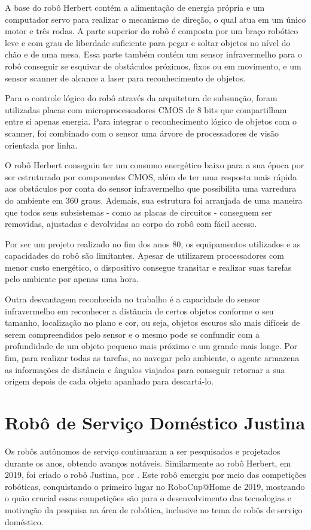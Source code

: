 A base do robô Herbert contém a alimentação de energia própria e um computador servo para realizar o mecanismo de direção, o qual atua em um único motor e três rodas. A parte superior do robô é composta por um braço robótico leve e com grau de liberdade suficiente para pegar e soltar objetos no nível do chão e de uma mesa. Essa parte também contém um sensor infravermelho para o robô conseguir se esquivar de obstáculos próximos, fixos ou em movimento, e um sensor scanner de alcance a laser para reconhecimento de objetos. 

Para o controle lógico do robô através da arquitetura de subsunção, foram utilizadas placas com microprocessadores CMOS de 8 bits  que compartilham entre si apenas energia. Para integrar o reconhecimento lógico de objetos com o scanner, foi combinado com o sensor uma árvore de processadores de visão orientada por linha. 

O robô Herbert conseguiu ter um consumo energético baixo para a sua época por ser estruturado por componentes CMOS, além de ter uma resposta mais rápida aos obstáculos por conta do sensor infravermelho que possibilita uma varredura do ambiente em 360 graus. Ademais, sua estrutura foi arranjada de uma maneira que todos seus subsistemas - como as placas de circuitos -  conseguem ser removidas, ajustadas e devolvidas ao corpo do robô com fácil acesso. 

Por ser um projeto realizado no fim dos anos 80, os equipamentos utilizados e as capacidades do robô são limitantes. Apesar de utilizarem processadores com menor custo energético, o dispositivo consegue transitar e realizar suas tarefas pelo ambiente por apenas uma hora. 

Outra desvantagem reconhecida no trabalho é a capacidade do sensor infravermelho em reconhecer a distância de certos objetos conforme o seu tamanho, localização no plano e cor, ou seja, objetos escuros são mais difíceis de serem compreendidos pelo sensor e o mesmo pode se confundir com a profundidade de um objeto pequeno mais próximo e um grande mais longe. Por fim, para realizar todas as tarefas, ao navegar pelo ambiente, o agente armazena as informações de distância e ângulos viajados para conseguir retornar a sua origem depois de cada objeto apanhado para descartá-lo.

\section{Robô de Serviço Doméstico Justina}
Os robôs autônomos de serviço continuaram a ser pesquisados e projetados durante os anos, obtendo avanços notáveis. Similarmente ao robô Herbert, em 2019, foi criado o robô Justina, por \citet{justina:2019}. Este robô emergiu por meio das competições robóticas, conquistando o primeiro lugar no RoboCup@Home de 2019, mostrando o quão crucial essas competições são para o desenvolvimento das tecnologias e motivação da pesquisa na área de robótica, inclusive no tema de robôs de serviço doméstico. 

